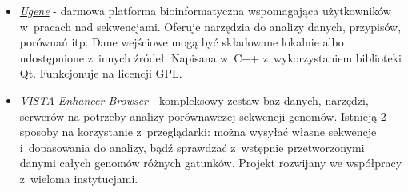 \begin{itemize}
	\item \href{http://ugene.net/}{\emph{Ugene}} - darmowa platforma bioinformatyczna wspomagająca użytkowników w~pracach nad sekwencjami. Oferuje narzędzia do analizy danych, przypisów, porównań itp. Dane wejściowe mogą być składowane lokalnie albo udostępnione z~innych źródeł. Napisana w~C++ z~wykorzystaniem biblioteki Qt. Funkcjonuje na licencji GPL.
	
	\item \href{http://enhancer.lbl.gov/}{\emph{VISTA Enhancer Browser}} - kompleksowy zestaw baz danych, narzędzi, serwerów na potrzeby analizy porównawczej sekwencji genomów. Istnieją 2 sposoby na korzystanie z~przeglądarki: można wysyłać własne sekwencje i~dopasowania do analizy, bądź sprawdzać z~wstępnie przetworzonymi danymi całych genomów różnych gatunków. Projekt rozwijany we współpracy z~wieloma instytucjami.
	
	
\end{itemize}